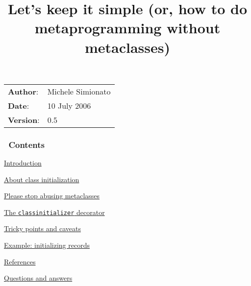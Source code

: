 \documentclass[10pt,a4paper,english]{article}
\title{Let's keep it simple (or, how to do metaprogramming without metaclasses)}
\author{}
\date{}
\newlength{\docinfowidth}
\newlength{\locallinewidth}
\begin{document}
\maketitle

\begin{center}
\begin{tabularx}{\docinfowidth}{lX}
\textbf{Author}: &
	Michele Simionato \\
\textbf{Date}: &
	10 July 2006 \\
\textbf{Version}: &
	0.5 \\
\end{tabularx}
\end{center}

\setlength{\locallinewidth}{\linewidth}
\hypertarget{contents}{}
\subsubsection*{~\hfill Contents\hfill ~}
\begin{list}{}{}
\item {} \href{\#introduction}{Introduction}

\item {} \href{\#about-class-initialization}{About class initialization}

\item {} \href{\#please-stop-abusing-metaclasses}{Please stop abusing metaclasses}

\item {} \href{\#the-classinitializer-decorator}{The \texttt{classinitializer} decorator}

\item {} \href{\#tricky-points-and-caveats}{Tricky points and caveats}

\item {} \href{\#example-initializing-records}{Example: initializing records}

\item {} \href{\#references}{References}

\item {} \href{\#questions-and-answers}{Questions and answers}

\end{list}




\hypertarget{introduction}{}
\end{document}
